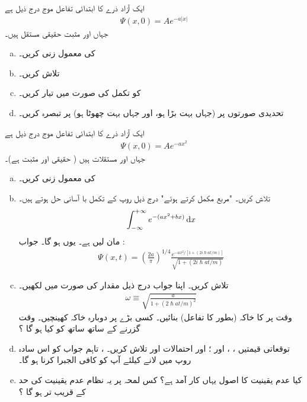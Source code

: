 ایک آزاد ذرے کا ابتدائی تفاعل موج درج ذیل ہے 
\begin{align*}
\Psi (x,0) = Ae^{ -a \left| x \right| } 
\end{align*}
جہاں  اور  مثبت حقیقی مستقل ہیں۔
\begin{enumerate}[a.]
\item 
{} کی معمول زنی کریں۔ 
\item
{} تلاش کریں۔ 
\item
{} کو تکمل کی صورت میں تیار کریں۔ 
\item
تحدیدی صورتوں پر (جہاں  بہت بڑا ہو، اور جہاں  بہت چھوٹا ہو) پر تبصرہ کریں۔ 
\end{enumerate}
 \quad {}
 ایک آزاد ذرے کا ابتدائی تفاعل موج درج ذیل ہے
\begin{align*}
\Psi(x,0) = A e^{-ax^{2}}
\end{align*}
جہاں  اور  مستقلات ہیں ( حقیقی اور مثبت ہے)۔ 
\begin{enumerate}[a.]
\item
{} کی معمول زنی کریں۔ 
\item
{} تلاش کریں۔  "مربع مکمل کرتے ہوئے" درج ذیل روپ کے تکمل با آسانی حل ہوتے ہیں۔ 
\begin{align*}
\int_{-\infty}^{+\infty} e^{-(ax^{2} +bx)} \dif x
\end{align*}
مان لیں  ہے۔ یوں  ہو گا۔ جواب : 
\begin{align*}
\Psi(x,t) = \left( \frac{2a}{\pi} \right) ^{1/4} \frac{e^{-ax^{2}/[1+(2i\hslash at/m)]}}{\sqrt{1+(2i\hslash at/m)}}
\end{align*}
\item
{} تلاش کریں۔ اپنا جواب درج ذیل مقدار کی صورت میں لکھیں۔ 
\begin{align*}
\omega \equiv \sqrt{\frac{a}{1+(2\hslash at/m)^{2}}}
\end{align*}
وقت  پر  کا خاکہ (بطور  کا تفاعل) بنائیں۔ کسی بڑے  پر دوبارہ خاکہ کھینچیں۔ وقت گزرنے کے ساتھ ساتھ  کو کیا ہو گا ؟
\item 
توقعاتی قیمتیں ، ،  اور ؛ اور احتمالات  اور  تلاش کریں۔
  ، تاہم جواب کو اس سادہ روپ میں لانے کیلئے آپ کو کافی الجبرا کرنا ہو گا۔ 
\item
کیا عدم یقینیت کا اصول یہاں کار آمد ہے؟ کس لمحہ  پر یہ نظام عدم یقینیت کی حد کے قریب تر ہو گا ؟
\end{enumerate}

